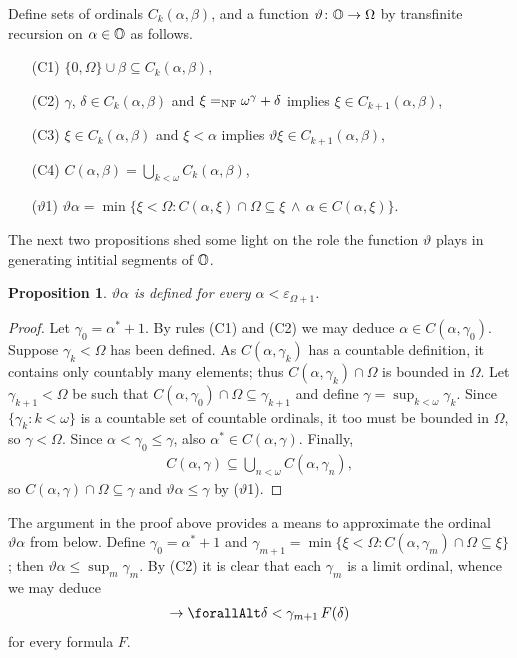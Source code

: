 \documentclass[UKenglish,cleveref,DIV=12]{scrartcl}
\let\forall\forallAlt
\newtheorem{proposition}[lemma]{Proposition}
\theoremstyle{definition}
\theoremstyle{definition}
\begin{document}
Define sets of ordinals $C_k(\alpha,\beta)$, and a function $\vartheta\colon\mathbb{O}\to\Omega$ by transfinite recursion on $\alpha\in\mathbb{O}$ as follows.
\begin{itemize}
 \item [(C1)] $\{0,\Omega\}\cup\beta\subseteq C_k(\alpha,\beta)$,
 \item [(C2)] $\gamma$, $\delta\in C_k(\alpha,\beta)$ and $\xi=_{\mathrm{NF}}\omega^\gamma+\delta$ implies $\xi\in C_{k+1}(\alpha,\beta)$,
 \item [(C3)] $\xi\in C_k(\alpha,\beta)$ and $\xi<\alpha$ implies $\vartheta\xi\in C_{k+1}(\alpha,\beta)$,
 \item [(C4)] $C(\alpha,\beta)=\bigcup_{k<\omega} C_k(\alpha,\beta)$,
 \item [($\vartheta$1)] $\vartheta\alpha=\min\{\xi<\Omega: C(\alpha,\xi)\cap\Omega\subseteq\xi\,\land\,\alpha\in C(\alpha,\xi)\}$.
\end{itemize}
The next two propositions shed some light on the role the function
$\vartheta$ plays in generating intitial segments of $\mathbb{O}$.
\begin{proposition}\label{extprop:theta1}
 $\vartheta\alpha$ is defined for every $\alpha<\varepsilon_{\Omega+1}$.
\end{proposition}
\begin{proof}
 Let $\gamma_0=\alpha^*+1$. By rules (C1) and (C2) we may deduce $\alpha\in C(\alpha,\gamma_0)$. Suppose $\gamma_k<\Omega$ has been defined. As $C(\alpha,\gamma_k)$ has a countable definition, it contains only countably many elements; thus $C(\alpha,\gamma_k)\cap\Omega$ is bounded in $\Omega$. Let $\gamma_{k+1}<\Omega$ be such that $C(\alpha,\gamma_0)\cap\Omega\subseteq\gamma_{k+1}$ and define $\gamma=\sup_{k<\omega}\gamma_k$. Since $\{\gamma_k:k<\omega\}$ is a countable set of countable ordinals, it too must be bounded in $\Omega$, so $\gamma<\Omega$. Since $\alpha<\gamma_0\le\gamma$, also $\alpha^*\in C(\alpha,\gamma)$. Finally,
 \begin{align*}
  C(\alpha,\gamma)\subseteq\bigcup_{n<\omega}C(\alpha,\gamma_n),
 \end{align*}
 so $C(\alpha,\gamma)\cap\Omega\subseteq \gamma$ and $\vartheta\alpha\le\gamma$ by ($\vartheta$1).
\end{proof}

The argument in the proof above provides a means to approximate the ordinal $\vartheta\alpha$ from below. Define $\gamma_0=\alpha^*+1$ and $\gamma_{m+1}=\min\{\xi<\Omega:C(\alpha,\gamma_m)\cap\Omega\subseteq\xi\}$; then $\vartheta\alpha\le\sup_{m}\gamma_m$. By (C2) it is clear that each $\gamma_m$ is a limit ordinal, whence we may deduce
\begin{align*}
 [(\forall\delta\in C(\alpha,\gamma_m)\cap\Omega)\forall\xi<\delta\,F(\xi)]\rightarrow \forall\delta<\gamma_{m+1}\,F(\delta)
\end{align*}
for every formula $F$.
\end{document}
